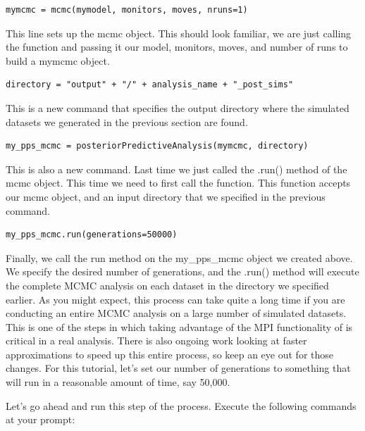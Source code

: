 {\tt \begin{snugshade*}
\begin{lstlisting}
mymcmc = mcmc(mymodel, monitors, moves, nruns=1)
\end{lstlisting}
\end{snugshade*}}
This line sets up the mcmc object. This should look familiar, we are just calling the  function and 
passing it our model, monitors, moves, and number of runs to build a mymcmc object.
{\tt \begin{snugshade*}
\begin{lstlisting}
directory = "output" + "/" + analysis_name + "_post_sims"
\end{lstlisting}
\end{snugshade*}}
This is a new command that specifies the output directory where the simulated datasets we generated in
the previous section are found.
{\tt \begin{snugshade*}
\begin{lstlisting}
my_pps_mcmc = posteriorPredictiveAnalysis(mymcmc, directory)
\end{lstlisting}
\end{snugshade*}}
This is also a new command. Last time we just called the .run() method of the mcmc object. This time 
we need to first call the  function. This function accepts our mcmc object, 
and an input directory that we specified in the previous command. 
{\tt \begin{snugshade*}
\begin{lstlisting}
my_pps_mcmc.run(generations=50000) 
\end{lstlisting}
\end{snugshade*}}
Finally, we call the run method on the my\_pps\_mcmc object we created above. We specify the desired 
number of generations, and the .run() method will execute the complete MCMC analysis on each dataset in 
the directory we specified earlier. As you might expect, this process can take quite a long time if you 
are conducting an entire MCMC analysis on a large number of simulated datasets. This is one of the steps 
in which taking advantage of the MPI functionality of \RevBayes is critical in a real analysis. There is 
also ongoing work looking at faster approximations to speed up this entire process, so keep an eye out 
for those changes. For this tutorial, let's set our number of generations to something that will run in 
a reasonable amount of time, say 50,000. 

Let's go ahead and run this step of the process. Execute the following commands at your \RevBayes prompt: 


